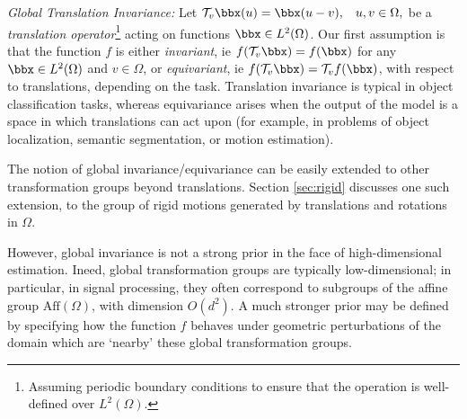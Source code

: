 {{\em Global Translation Invariance:}} 
Let 
${\cal T}_v \bbx(u) = \bbx(u - v), \hspace{3mm} u, v \in \Omega,$ 
be a {\em translation operator}\footnote{
Assuming periodic boundary conditions to 
ensure that the operation is well-defined over $L^2(\Omega)$.
} acting on functions $\bbx \in L^2(\Omega)$. %
%
Our first assumption is that the function $f$ is either {\em invariant}, ie $f({\cal T}_v \bbx) = f(  \bbx) $ for any $\bbx \in L^2(\Omega)$ and $v\in \Omega$, or {\em equivariant}, ie $f({\cal T}_v \bbx) = {\cal T}_v f(\bbx)$,  with 
respect to translations, depending on the task. 
 Translation invariance is typical in object classification tasks, whereas equivariance  
 arises when the output of the model is a space in which translations can act upon (for example, in problems of object localization, 
 semantic segmentation, or motion estimation). 
 
 The notion of global invariance/equivariance can be 
 easily extended to other transformation groups beyond translations. Section \ref{sec:rigid} discusses one such extension, to the group of rigid motions generated by translations and rotations in $\Omega$. 
 

However, global invariance is not a strong prior in the face of high-dimensional estimation. Ineed, global transformation groups are typically low-dimensional; in particular, in signal processing, they often correspond to subgroups of the affine group $\mathrm{Aff}(\Omega)$, with dimension $O(d^2)$. A much stronger prior may be defined by specifying how the function $f$ behaves under geometric perturbations of the domain which are `nearby' these global transformation groups.

